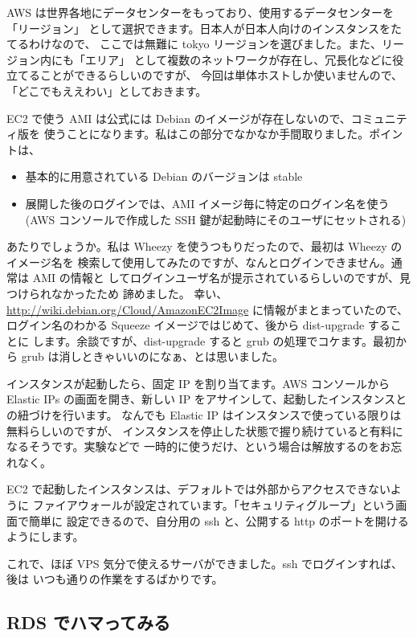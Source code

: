 \documentclass[mingoth,a4paper]{jsarticle}
\begin{document}
AWS は世界各地にデータセンターをもっており、使用するデータセンターを「リージョン」
として選択できます。日本人が日本人向けのインスタンスをたてるわけなので、
ここでは無難に tokyo リージョンを選びました。また、リージョン内にも「エリア」
として複数のネットワークが存在し、冗長化などに役立てることができるらしいのですが、
今回は単体ホストしか使いませんので、「どこでもええわい」としておきます。

EC2 で使う AMI は公式には Debian のイメージが存在しないので、コミュニティ版を
使うことになります。私はこの部分でなかなか手間取りました。ポイントは、

\begin{itemize}
\item 基本的に用意されている Debian のバージョンは stable
\item 展開した後のログインでは、AMI イメージ毎に特定のログイン名を使う (AWS コンソールで作成した SSH 鍵が起動時にそのユーザにセットされる)
\end{itemize}

あたりでしょうか。私は Wheezy を使うつもりだったので、最初は Wheezy のイメージ名を
検索して使用してみたのですが、なんとログインできません。通常は AMI の情報と
してログインユーザ名が提示されているらしいのですが、見つけられなかったため
諦めました。
幸い、\url{http://wiki.debian.org/Cloud/AmazonEC2Image} に情報がまとまっていたので、
ログイン名のわかる Squeeze イメージではじめて、後から dist-upgrade することに
します。余談ですが、dist-upgrade すると grub の処理でコケます。最初から grub
は消しときゃいいのになぁ、とは思いました。

インスタンスが起動したら、固定 IP を割り当てます。AWS コンソールから Elastic IPs
の画面を開き、新しい IP をアサインして、起動したインスタンスとの紐づけを行います。
なんでも Elastic IP はインスタンスで使っている限りは無料らしいのですが、
インスタンスを停止した状態で握り続けていると有料になるそうです。実験などで
一時的に使うだけ、という場合は解放するのをお忘れなく。

EC2 で起動したインスタンスは、デフォルトでは外部からアクセスできないように
ファイアウォールが設定されています。「セキュリティグループ」という画面で簡単に
設定できるので、自分用の ssh と、公開する http のポートを開けるようにします。

これで、ほぼ VPS 気分で使えるサーバができました。ssh でログインすれば、後は
いつも通りの作業をするばかりです。

\subsection{RDS でハマってみる}
\end{document}
